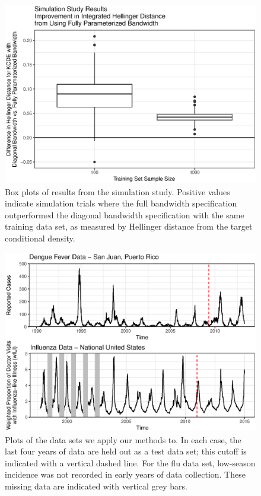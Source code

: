 \documentclass[times, doublespace]{simauth}\usepackage[]{graphicx}\usepackage[]{color}
\makeatletter
\def\maxwidth{ %
  \ifdim\Gin@nat@width>\linewidth
    \linewidth
  \else
    \Gin@nat@width
  \fi
}
\newenvironment{knitrout}{}{} %
\makeatother
\begin{document}
\begin{figure}
\begin{knitrout}
\color{fgcolor}
\includegraphics[width=\maxwidth]{figure/Fig2_Evan_L_Ray_SimStudyResultsPlot-1} 

\end{knitrout}
\caption{Box plots of results from the simulation study.  Positive values
indicate simulation trials where the full bandwidth specification outperformed the diagonal bandwidth
specification with the same training data set, as measured by Hellinger distance from the
target conditional density.}
\label{fig:SimStudyResultsPlot}
\end{figure}


\begin{figure}
\begin{knitrout}
\color{fgcolor}
\includegraphics[width=\maxwidth]{figure/Fig3_Evan_L_Ray_InitialDataPlot-1} 

\end{knitrout}
\caption{Plots of the data sets we apply our methods to.  In each case, the last
four years of data are held out as a test data set; this cutoff is indicated
with a vertical dashed line.  For the flu data set, low-season incidence was not
recorded in early years of data collection.  These missing data are indicated
with vertical grey bars.}
\label{fig:IntialDataPlots}
\end{figure}
\end{document}
